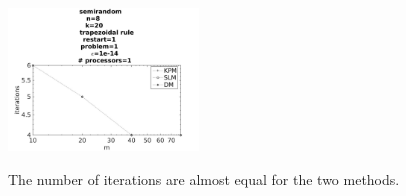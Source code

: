 \begin{figure}[H]
        \centering

                \includegraphics[width=0.45\textwidth]{../MATLAB/fig/sresultiter.jpg}
        \label{fig:sresultiter}
        \caption{The number of iterations are almost equal for the two methods.}
\end{figure}

